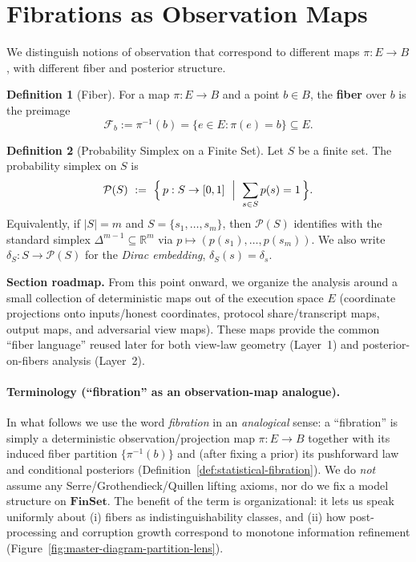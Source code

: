 \documentclass[11pt,a4paper]{article}
\theoremstyle{definition}
\newtheorem{definition}{Definition}[section]
\theoremstyle{plain}
\newcommand{\cF}{\mathcal{F}}
\newcommand{\Prob}{\mathcal{P}}
\begin{document}
\section{Fibrations as Observation Maps}
\label{sec:fibrations-as-observation-maps}
We distinguish notions of observation that correspond to different maps $\pi:E\to B$, with different fiber and posterior structure.

\begin{definition}[Fiber]
\label{def:fiber}
For a map $\pi: E \to B$ and a point $b \in B$, the \textbf{fiber} over $b$ is the preimage
\[
\cF_b := \pi^{-1}(b) = \{ e \in E : \pi(e) = b \} \subseteq E.
\]
\end{definition}

\begin{definition}[Probability Simplex on a Finite Set]
\label{def:prob-simplex}
Let $S$ be a finite set. The probability simplex on $S$ is
\begin{equation}
\label{eq:prob-simplex}
\Prob(S)\ :=\ \Bigl\{\,p:S\to[0,1]\ \Bigm|\ \sum_{s\in S} p(s)=1\,\Bigr\}.
\end{equation}
Equivalently, if $|S|=m$ and $S=\{s_1,\dots,s_m\}$, then $\Prob(S)$ identifies with the standard simplex
$\Delta^{m-1}\subseteq\mathbb{R}^m$ via $p\mapsto (p(s_1),\dots,p(s_m))$.
We also write $\delta_S:S\to\Prob(S)$ for the \emph{Dirac embedding}, $\delta_S(s)=\delta_s$.
\end{definition}

\noindent \textbf{Section roadmap.} From this point onward, we organize the analysis around a small collection of deterministic maps out of the execution space $E$ (coordinate projections onto inputs/honest coordinates, protocol share/transcript maps, output maps, and adversarial view maps). These maps provide the common ``fiber language'' reused later for both view-law geometry (Layer~1) and posterior-on-fibers analysis (Layer~2).

\paragraph{Terminology (``fibration'' as an observation-map analogue).}
In what follows we use the word \emph{fibration} in an \emph{analogical} sense: a ``fibration'' is simply a deterministic observation/projection map $\pi:E\to B$ together with its induced fiber partition $\{\pi^{-1}(b)\}$ and (after fixing a prior) its pushforward law and conditional posteriors (Definition~\ref{def:statistical-fibration}).
We do \emph{not} assume any Serre/Grothendieck/Quillen lifting axioms, nor do we fix a model structure on $\mathbf{FinSet}$.
The benefit of the term is organizational: it lets us speak uniformly about (i) fibers as indistinguishability classes, and (ii) how post-processing and corruption growth correspond to monotone information refinement (Figure~\ref{fig:master-diagram-partition-lens}).
\end{document}
